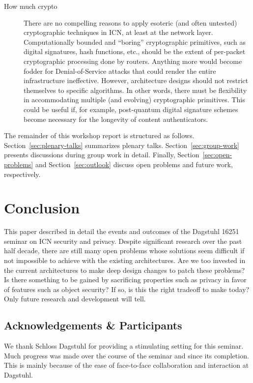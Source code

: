 \documentclass{sig-alternate-10pt}
\begin{document}
\begin{description}
  \item[How much crypto] There are no compelling reasons to apply esoteric (and often untested)
cryptographic techniques in ICN, at least at the network layer. Computationally bounded
and ``boring'' cryptographic primitives, such as digital signatures, hash functions, etc.,
should be the extent of per-packet cryptographic processing done by routers. Anything
more would become fodder for Denial-of-Service attacks that could render the entire
infrastructure ineffective. However, architecture designs should not restrict themselves
to specific algorithms. In other words, there must be flexibility in accommodating
multiple (and evolving) cryptographic primitives. This could be useful if, for example,
post-quantum digital signature schemes become necessary for the longevity of content authenticators.
\end{description}

The remainder of this workshop report is structured as follows.
Section~\ref{sec:plenary-talks} summarizes plenary talks.
Section~\ref{sec:group-work} presents discussions during group work in detail.
Finally, Section~\ref{sec:open-problems} and Section~\ref{sec:outlook} discuss open problems and future work, respectively.







\section{Conclusion}
This paper described in detail the events and outcomes of the Dagstuhl 16251
seminar on ICN security and privacy. Despite significant research over the past
half decade, there are still many open problems whose solutions seem difficult
if not impossible to achieve with the existing architectures. Are we too invested
in the current architectures to make deep design changes to patch these problems?
Is there something to be gained by sacrificing properties such as privacy in favor
of features such as object security? If so, is this the right tradeoff to make
today? Only future research and development will tell.

\subsection{Acknowledgements \& Participants}
We thank Schloss Dagstuhl for providing a stimulating setting for this seminar. Much
progress was made over the course of the seminar and since its completion. This is mainly
because of the ease of face-to-face collaboration and interaction at Dagstuhl.
\end{document}
